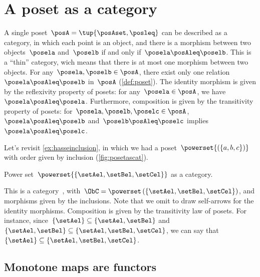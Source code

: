

\section{A poset as a category}
\label{sec:posetsarecats}

A single poset~$\posA=\tup{\posAset, \posleq}$ can be described as a category, in which each point is an object, and there is a morphism between two objects~$\posela$ and~$\poselb$ if and only if~$\posela \posAleq \poselb$.
This is a ``thin'' category, wich means that there is at most one morphism between two objects.
For any~$\posela,\poselb\in \posA$, there exist only one relation~$\posela\posAleq \poselb$ in~$\posA$ (\cref{def:poset}).
The identity morphism is given by the reflexivity property of posets: for any~$\posela\in \posA$, we have~$\posela \posAleq \posela$.
Furthermore, composition is given by the transitivity property of posets: for~$\posela,\poselb,\poselc \in \posA$,~$\posela\posAleq \poselb$ and~$\poselb\posAleq \poselc$ implies~$\posela\posAleq \poselc$.

\begin{example}
    Let's revisit \cref{ex:hasseinclusion}, in which we had a poset~$\powerset{\left(\{a,b,c\}\right)}$ with order given by inclusion (\cref{fig:posetascat}).
    
    \begin{marginfigure}
        \centering
        \caption{Power set~$\powerset{\{\setAel,\setBel,\setCel\}}$ as a category. \label{fig:posetascat}}
    \end{marginfigure}
    
    This is a category~\CatC, with~$\ObC=\powerset\left(\{\setAel,\setBel,\setCel\}\right)$, and morphisms given by the inclusions.
    Note that we omit to draw self-arrows for the identity morphisms.
    Composition is given by the transitivity law of posets.
For instance, since~$\{\setAel\}\subseteq \{\setAel,\setBel\}$ and~$\{\setAel,\setBel\} \subseteq \{\setAel,\setBel,\setCel\}$, we can say that~$\{\setAel\}\subseteq \{\setAel,\setBel,\setCel\}$.
\end{example}

\subsection{Monotone maps are functors}

